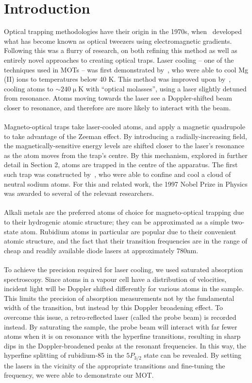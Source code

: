 \documentclass[11pt,twoside,a4paper]{article}
\begin{document}
\section{Introduction}
Optical trapping methodologies have their origin in the 1970s, when~\cite{ashkin1970} developed what has become known
as optical tweezers using electromagnetic gradients. Following this was a flurry of research, on both refining this method
as well as entirely novel approaches to creating optical traps. Laser cooling -- one of the techniques used in MOTs -- was
first demonstrated by~\cite{wineland1978}, who were able to cool Mg (II) ions to temperatures below 40 K. This method was improved
upon by~\cite{chu1985}, cooling atoms to \(\sim240 \operatorname{\mu}\)K with ``optical molasses'', using a laser slightly detuned from resonance.
Atoms moving towards the laser see a Doppler-shifted beam closer to resonance, and therefore are more likely to interact with the beam.
\\\\
Magneto-optical traps take laser-cooled atoms, and apply a magnetic quadrupole to take advantage of the Zeeman effect. By
introducing a radially-increasing field, the magnetically-sensitive energy levels are shifted closer to the laser's resonance as the atom moves
from the trap's centre. By this mechanism, explored in further detail in Section 2, atoms are trapped in the centre of the
apparatus. The first such trap was constructed by~\cite{raab1987}, who were able to confine and cool a cloud of neutral sodium atoms. For this and related
work, the 1997 Nobel Prize in Physics was awarded to several of the relevant researchers.
\\\\
Alkali metals are the preferred atoms of choice for magneto-optical trapping due to their hydrogenic atomic structure; they can be approximated
as a simple two-state atom. Rubidium atoms in particular are popular due to their convenient atomic structure, and the fact that their transition frequencies
are in the range of cheap and readily available diode lasers at approximately 780nm.
\\\\
To achieve the precision required for laser cooling, we used saturated absorption spectroscopy. Since atoms in a vapour cell have a distribution of velocities,
incident light will be Doppler shifted differently for various atoms in the sample. This limits the precision of absorption measurements not by the fundamental width
of the transition, but instead by this Doppler broadening effect. To overcome this issue, a retro-reflected laser (called the probe beam) is recorded instead. By saturating the sample,
the probe beam will interact with far fewer atoms when it is on resonance with the hyperfine transitions, resulting in sharp dips in the Doppler-broadened peaks at the resonant frequencies.
In this way, the hyperfine splitting of rubidium-85 in the \(5P_{3/2}\) state can be revealed. By setting the lasers in the vicinity of the appropriate transitions and fine-tuning the frequency,
we were able to demonstrate our MOT.\@
\vfill
\pagebreak
\end{document}
